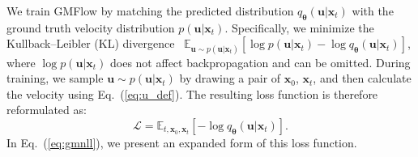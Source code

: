 \documentclass{article}
\def\vtheta{{\bm{\theta}}}
\def\vu{{\bm{u}}}
\def\vx{{\bm{x}}}
\newcommand{\E}{\mathbb{E}}
\newcommand{\Ls}{\mathcal{L}}
\theoremstyle{custom}
\theoremstyle{definition}
\theoremstyle{remark}
\newcommand{\methodname}{{GMFlow}}
\begin{document}
We train \methodname{} by matching the predicted distribution $q_{\vtheta}(\vu | \vx_t)$ with the ground truth velocity distribution $p(\vu | \vx_t)$.
Specifically, we minimize the Kullback–Leibler (KL) divergence~\cite{kldiv}
$\E_{\vu\sim p(\vu|\vx_t)}[\log p(\vu|\vx_t) - \log q_{\vtheta}(\vu | \vx_t)]$,
where $\log p(\vu|\vx_t)$ does not affect backpropagation and can be omitted. 
During training, we sample $\vu\sim p(\vu|\vx_t)$ by  
drawing a pair of $\vx_0$, $\vx_t$, and then calculate the velocity using Eq.~(\ref{eq:u_def}). The resulting loss function is 
therefore reformulated as: 
\begin{equation}
    \Ls = \E_{t,\vx_0,\vx_t}[-\log q_{\vtheta}(\vu | \vx_t)].
    \label{eq:loss}
\end{equation}
In Eq.~(\ref{eq:gmnll}), we present an expanded form of this loss function.
\end{document}
